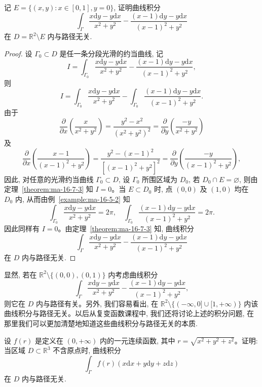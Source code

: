 \begin{example}\label{example:ma-16-7-1}
记 $E=\{(x,y):x\in[0,1],y=0\}$, 证明曲线积分
\[
  \int_\Gamma\frac{x\mathrm dy-y\mathrm dx}{x^2+y^2}
  -\frac{(x-1)\mathrm dy-y\mathrm dx}{(x-1)^2+y^2}
\]
在 $D=\mathbb R^2\setminus E$ 内与路径无关.
\end{example}


\begin{proof}
设 $\Gamma_0\subset D$ 是任一条分段光滑的约当曲线, 记
\[
  I=\int_{\Gamma_0}\frac{x\mathrm dy-y\mathrm dx}{x^2+y^2}
  -\frac{(x-1)\mathrm dy-y\mathrm dx}{(x-1)^2+y^2},
\]
则
\[
  I=\int_{\Gamma_0}\frac{x\mathrm dy-y\mathrm dx}{x^2+y^2}
  -\int_{\Gamma_0}\frac{(x-1)\mathrm dy-y\mathrm dx}{(x-1)^2+y^2}.
\]
由于
\[
  \frac{\partial}{\partial x}\left(\frac{x}{x^2+y^2}\right)
  =\frac{y^2-x^2}{(x^2+y^2)^2}
  =\frac{\partial}{\partial y}\left(\frac{-y}{x^2+y^2}\right)
\]
及
\[
  \frac{\partial}{\partial x}\left(\frac{x-1}{(x-1)^2+y^2}\right)
  =\frac{y^2-(x-1)^2}{[(x-1)^2+y^2]^2}
  =\frac{\partial}{\partial y}\left(\frac{-y}{(x-1)^2+y^2}\right),
\]
因此, 对任意的光滑约当曲线 $\Gamma_0\subset D$, 设 $\Gamma_0$ 所围区域为 $D_0$, 若 $D_0\cap E=\varnothing$, 则由定理~\ref{theorem:ma-16-7-3} 知 $I=0$。当 $E\subset D_0$ 时, 点 $(0,0)$ 及 $(1,0)$ 均在 $D_0$ 内, 从而由例~\ref{example:ma-16-5-2} 知
\[
  \int_{\Gamma_0}\frac{x\mathrm dy-y\mathrm dx}{x^2+y^2}=2\pi,
  \quad
  \int_{\Gamma_0}\frac{(x-1)\mathrm dy-y\mathrm dx}{(x-1)^2+y^2}=2\pi.
\]
因此同样有 $I=0$。由定理~\ref{theorem:ma-16-7-3} 知, 曲线积分
\[
  \int_\Gamma\frac{x\mathrm dy-y\mathrm dx}{x^2+y^2}
  -\frac{(x-1)\mathrm dy-y\mathrm dx}{(x-1)^2+y^2}
\]
在 $D$ 内与路径无关.
\end{proof}


\begin{remark}\label{remark:ma-16-source-73}
显然, 若在 $\mathbb R^2\setminus\{(0,0),(0,1)\}$ 内考虑曲线积分
\[
  \int_\Gamma\frac{x\mathrm dy-y\mathrm dx}{x^2+y^2}
  -\frac{(x-1)\mathrm dy-y\mathrm dx}{(x-1)^2+y^2},
\]
则它在 $D$ 内与路径有关。另外, 我们容易看出, 在 $\mathbb R^2\setminus\{(-\infty,0]\cup[1,+\infty)\}$ 内该曲线积分与路径无关。以后从复变函数课程中, 我们还将讨论上述的积分问题, 在那里我们可以更加清楚地知道这些曲线积分与路径无关的本质.
\end{remark}


\begin{example}\label{example:ma-16-7-2}
设 $f(r)$ 是定义在 $(0,+\infty)$ 内的一元连续函数, 其中 $r=\sqrt{x^2+y^2+z^2}$。证明: 当区域 $D\subset\mathbb R^3$ 不含原点时, 曲线积分
\[
  \int_\Gamma f(r)(x\mathrm dx+y\mathrm dy+z\mathrm dz)
\]
在 $D$ 内与路径无关.
\end{example}


